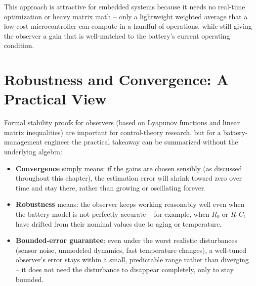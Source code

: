 This approach is attractive for embedded systems because it needs no real-time optimization or heavy matrix math -- only a lightweight weighted average that a low-cost microcontroller can compute in a handful of operations, while still giving the observer a gain that is well-matched to the battery's current operating condition.



\section{Robustness and Convergence: A Practical View}
\label{sec:robustness_convergence}

Formal stability proofs for observers (based on Lyapunov functions and linear matrix inequalities) are important for control-theory research, but for a battery-management engineer the practical takeaway can be summarized without the underlying algebra:

\begin{itemize}
    \item \textbf{Convergence} simply means: if the gains are chosen sensibly (as discussed throughout this chapter), the estimation error will shrink toward zero over time and stay there, rather than growing or oscillating forever.
    \item \textbf{Robustness} means: the observer keeps working reasonably well even when the battery model is not perfectly accurate -- for example, when $R_0$ or $R_1C_1$ have drifted from their nominal values due to aging or temperature.
    \item \textbf{Bounded-error guarantee}: even under the worst realistic disturbances (sensor noise, unmodeled dynamics, fast temperature changes), a well-tuned observer's error stays within a small, predictable range rather than diverging -- it does not need the disturbance to disappear completely, only to stay bounded.
\end{itemize}

